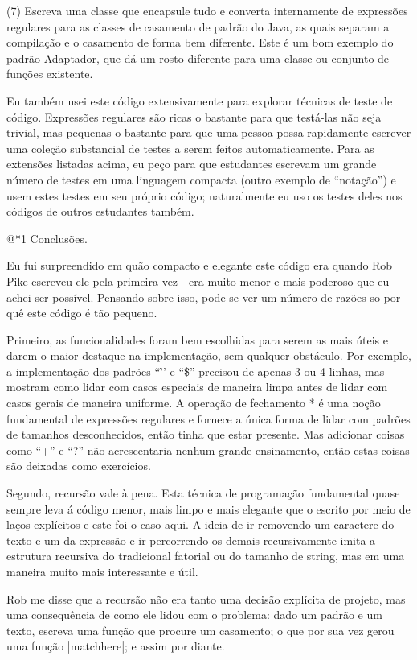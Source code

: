 (7) Escreva uma classe que encapsule tudo e converta internamente de
expressões regulares para as classes de casamento de padrão do Java,
as quais separam a compilação e o casamento de forma bem
diferente. Este é um bom exemplo do padrão Adaptador, que dá um rosto
diferente para uma classe ou conjunto de funções existente.

Eu também usei este código extensivamente para explorar técnicas de
teste de código. Expressões regulares são ricas o bastante para que
testá-las não seja trivial, mas pequenas o bastante para que uma
pessoa possa rapidamente escrever uma coleção substancial de testes a
serem feitos automaticamente. Para as extensões listadas acima, eu
peço para que estudantes escrevam um grande número de testes em uma
linguagem compacta (outro exemplo de ``notação'') e usem estes testes
em seu próprio código; naturalmente eu uso os testes deles nos códigos
de outros estudantes também.

@*1 Conclusões.

Eu fui surpreendido em quão compacto e elegante este código era quando
Rob Pike escreveu ele pela primeira vez---era muito menor e mais
poderoso que eu achei ser possível. Pensando sobre isso, pode-se ver
um número de razões so por quê este código é tão pequeno. 

Primeiro, as funcionalidades foram bem escolhidas para serem as mais
úteis e darem o maior destaque na implementação, sem qualquer
obstáculo. Por exemplo, a implementação dos padrões ``\^'' e ``\$''
precisou de apenas 3 ou 4 linhas, mas mostram como lidar com casos
especiais de maneira limpa antes de lidar com casos gerais de maneira
uniforme. A operação de fechamento * é uma noção fundamental de
expressões regulares e fornece a única forma de lidar com padrões de
tamanhos desconhecidos, então tinha que estar presente. Mas adicionar
coisas como ``+'' e ``?'' não acrescentaria nenhum grande ensinamento,
então estas coisas são deixadas como exercícios.

Segundo, recursão vale à pena. Esta técnica de programação fundamental
quase sempre leva á código menor, mais limpo e mais elegante que o
escrito por meio de laços explícitos e este foi o caso aqui. A ideia
de ir removendo um caractere do texto e um da expressão e ir
percorrendo os demais recursivamente imita a estrutura recursiva do
tradicional fatorial ou do tamanho de string, mas em uma maneira muito
mais interessante e útil.

Rob me disse que a recursão não era tanto uma decisão explícita de
projeto, mas uma consequência de como ele lidou com o problema: dado
um padrão e um texto, escreva uma função que procure um casamento; o
que por sua vez gerou uma função |matchhere|; e assim por
diante.

